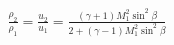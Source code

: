 \documentclass[10pt]{article}
\begin{document}
\begin{align*}\frac{\rho_{2}}{\rho_{1}}
= \frac{u_{2}}{u_{1}}
= \frac{
\left(\gamma+1\right) M_{1}^{2} \sin^2 \beta
}
{
2 + \left(\gamma - 1 \right) M_{1}^{2} \sin^2 \beta
}\end{align*}
\end{document}
